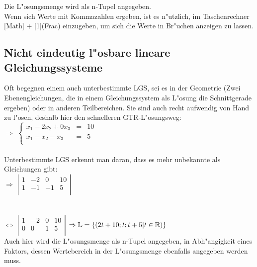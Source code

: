 \documentclass[../MAIN/main.tex]{subfiles}
\begin{document}
Die L"osungsmenge wird als n-Tupel angegeben.\\
Wenn sich Werte mit Kommazahlen ergeben, ist es n"utzlich, im Taschenrechner [Math] $+$ [1](Frac) einzugeben, um sich die Werte in Br"uchen anzeigen zu lassen.\\

	\subsection{Nicht eindeutig l"osbare lineare Gleichungssysteme}

Oft begegnen einem auch unterbestimmte LGS, sei es in der Geometrie (Zwei Ebenengleichungen, die in einem Gleichungssystem als L"osung die Schnittgerade ergeben) oder in anderen Teilbereichen. Sie sind auch recht aufwendig von Hand zu l"osen, deshalb hier den schnelleren GTR-L"osungsweg:\\

$\Rightarrow$ $\left\{ \begin{array}{rcl}
x_{1}-2x_{2}+0x_{3}&=&10\\
x_{1}-x_{2}-x_{3}& =& 5\\
\end{array}\right.$\\
\\
Unterbestimmte LGS erkennt man daran, dass es mehr unbekannte als Gleichungen gibt:\\

$\Rightarrow$ $\left\vert \begin{array}{rccl}
1&-2&0&10\\
1&-1&-1& 5 \\
\end{array}\right\vert$\\
\\
\\
$\Leftrightarrow$ $\left\vert \begin{array}{rccl}
1&-2&0&10\\
0&0&1&5 \\
\end{array}\right\vert$  \qquad $\Rightarrow \mathbb{L}=\{(2t+10;t;t+5|t\in\mathbb{R}) \}$ \\

Auch hier wird die L"osungsmenge als n-Tupel angegeben, in Abh"angigkeit eines Faktors, dessen Wertebereich in der L"osungsmenge ebenfalls angegeben werden muss.\\\\
\end{document}
